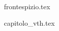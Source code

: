 \documentclass[
	a4paper,
	cleardoublepage=empty,
	headings=twolinechapter,
	numbers=autoenddot,
]{scrbook}
\begin{document}
{frontespizio.tex}

\tableofcontents
\listoffigures
\mainmatter

{capitolo_vth.tex}



\end{document}
